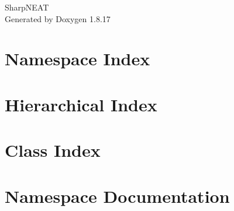 \let\mypdfximage\pdfximage\def\pdfximage{\immediate\mypdfximage}\documentclass[twoside]{book}
\newcommand{\+}{\discretionary{\mbox{\scriptsize$\hookleftarrow$}}{}{}}
\newcommand{\clearemptydoublepage}{%
  \newpage{\pagestyle{empty}\cleardoublepage}%
}
\begin{document}
\hypersetup{pageanchor=false,
             bookmarksnumbered=true,
             pdfencoding=unicode
            }
\begin{titlepage}
\vspace*{7cm}
\begin{center}%
{\Large Sharp\+N\+E\+AT }\\
\vspace*{1cm}
{\large Generated by Doxygen 1.8.17}\\
\end{center}
\end{titlepage}
\clearemptydoublepage
{}
\tableofcontents
\clearemptydoublepage
{}
\hypersetup{pageanchor=true}

\chapter{Namespace Index}

\chapter{Hierarchical Index}

\chapter{Class Index}

\chapter{Namespace Documentation}

















\end{document}
